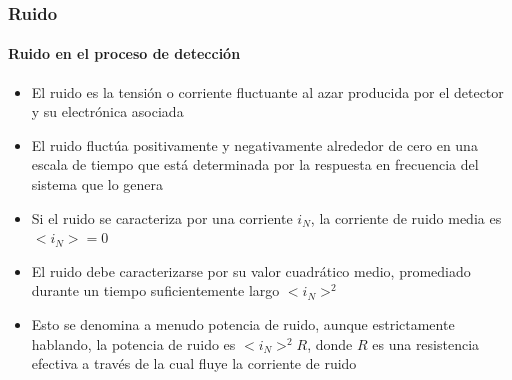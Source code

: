 \documentclass{beamer}
\begin{document}
\begin{frame}
\frametitle{Ruido}
\framesubtitle{Ruido en el proceso de detección}
\begin{itemize}
\item El ruido es la \alert{tensión o corriente fluctuante al azar} producida por el
detector y su electrónica asociada
\item El ruido fluctúa positivamente y negativamente alrededor de cero en una
escala de tiempo que está determinada por la respuesta en frecuencia del sistema
que lo genera
\item Si el ruido se caracteriza por una corriente $i_N$, la corriente de ruido
media es $<\!i_N\!> = 0$
\item El ruido debe caracterizarse por su valor cuadrático medio, promediado
durante un tiempo suficientemente largo \alert{$<\!i_N\!>^2$}
\item Esto se denomina a menudo {\color{blue}potencia de ruido}, aunque estrictamente
hablando, la potencia de ruido es \alert{$<\!i_N\!>^2 R$}, donde $R$ es una
{\color{blue}resistencia efectiva} a través de la cual fluye la corriente de ruido
\end{itemize}
\end{frame} 

\end{document}
